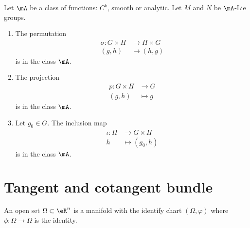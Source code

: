 \begin{proposition}      \label{PROPooCHVLooVFScOl}
    Let \( \mA\) be a class of functions: \( C^k\), smooth or analytic.  Let \( M\) and \( N\) be \( \mA\)-Lie groups.
    \begin{enumerate}
        \item
            The permutation
            \begin{equation}
                \begin{aligned}
                    \sigma\colon G\times H&\to H\times G \\
                    (g,h)&\mapsto (h,g) 
                \end{aligned}
            \end{equation}
            is in the class \( \mA\).
        \item
            The projection
            \begin{equation}
                \begin{aligned}
                    p\colon G\times H&\to G \\
                    (g,h)&\mapsto g 
                \end{aligned}
            \end{equation}
            is in the class \( \mA\).
        \item
            Let \( g_0\in G\). The inclusion map
            \begin{equation}
                \begin{aligned}
                    \iota\colon H&\to G\times H \\
                    h&\mapsto (g_0,h) 
                \end{aligned}
            \end{equation}
            is in the class \( \mA\).
    \end{enumerate}
\end{proposition}

\section{Tangent and cotangent bundle}

\begin{definition}
    An open set \( \Omega\subset \eR^n\) is a manifold with the identify chart \( (\Omega, \varphi)\) where \( \phi\colon \Omega\to \Omega\) is the identity.
\end{definition}


